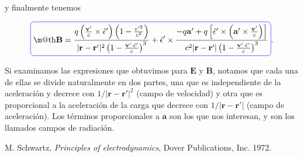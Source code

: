 \documentclass[a4paper,11pt]{article}
\makeatletter
\numberwithin{equation}{section}
\newcommand*{\boxcolor}{blue}
\renewcommand{\boxed}[1]{\textcolor{\boxcolor}{%
\tikz[baseline={([yshift=-1ex]current bounding box.center)}] \node [rectangle, minimum width=1ex,rounded corners,draw] {\normalcolor\m@th$\displaystyle#1$};}}
\makeatother
\begin{document}
y finalmente tenemos 

\begin{equation}
 \boxed{\mathbf{B} = \frac{q\left(\frac{\mathbf{v}'}{c} \times \hat{\mathbf{\epsilon}}'\right) 
 \left(1 - \frac{v'^2}{c^2}\right)}{|\mathbf{r} - \mathbf{r}'|^2\left(1 - \frac{\mathbf{v}'\cdot 
 \hat{\mathbf{\epsilon}}'}{c} \right)^3} + \hat{\mathbf{\epsilon}}' \times 
 \frac{-q\mathbf{a}' + q\left[\hat{\mathbf{\epsilon}}' \times 
 \left(\mathbf{a}' \times \frac{\mathbf{v}'}{c} \right) \right]}{c^2|\mathbf{r} - \mathbf{r}'|
 \left(1 - \frac{\mathbf{v}'\cdot  \hat{\mathbf{\epsilon}}'}{c} \right)^3}}.
\end{equation}

Si examinamos las expresiones que obtuvimos para $\mathbf{E}$ y $\mathbf{B}$, notamos 
que cada una de ellas se divide naturalmente en dos partes, una que es independiente de 
la aceleración y decrece con $1/|\mathbf{r} - \mathbf{r}'|^2$ (campo de velocidad) 
y otra que es proporcional a la aceleración de la carga que decrece con 
$1/|\mathbf{r} - \mathbf{r}'|$ (campo de aceleración). Los términos proporcionales a 
$\mathbf{a}$ son los que nos interesan, y son los llamados campos de radiación. 

\begin{thebibliography}{10}
 M. Schwartz, \emph{Principles of electrodynamics}, Dover Publications, Inc. 1972.
\end{thebibliography}
\end{document}
